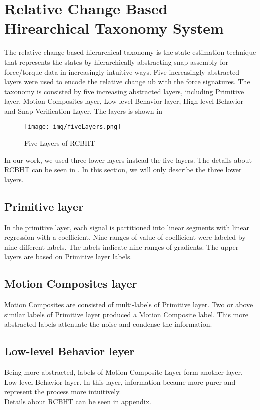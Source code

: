 \section{Relative Change Based Hirearchical Taxonomy System}
The relative change-based hierarchical taxonomy is the state estimation technique that represents the states by hierarchically abstracting snap assembly for force/torque data in increasingly intuitive ways. Five increasingly abstracted layers were used to encode the relative change ub with the force signatures. The taxonomy is consisted by five increasing abstracted layers, including Primitive layer, Motion Composites layer, Low-level Behavior layer, High-level Behavior and Snap Verification Layer. The layers is shown in \\
\begin{figure}[h]
    \centering
    \texttt{[image: img/fiveLayers.png]}
    \caption{Five Layers of RCBHT}
    \label{RCBHT}
\end{figure} 
\indent In our work, we used three lower layers instead the five layers. The details about RCBHT can be seen in \cite{2012IROS-Rojas-RCBHT}. In this section, we will only describe the three lower layers.
\subsection{Primitive layer}
In the primitive layer, each signal is partitioned into linear segments with linear regression with a coefficient. Nine ranges of value of coefficient were labeled by nine different labels. The labels indicate nine ranges of gradients. The upper layers are based on Primitive layer labels.
\subsection{Motion Composites layer}
Motion Composites are consisted of multi-labels of Primitive layer. Two or above similar labels of Primitive layer produced a Motion Composite label. This more abstracted labels attenuate the noise and condense the information.
\subsection{Low-level Behavior leyer}
Being more abstracted, labels of Motion Composite Layer form another layer, Low-level Behavior layer. In this layer, information became more purer and represent the process more intuitively.\\

\indent Details about RCBHT can be seen in appendix.



